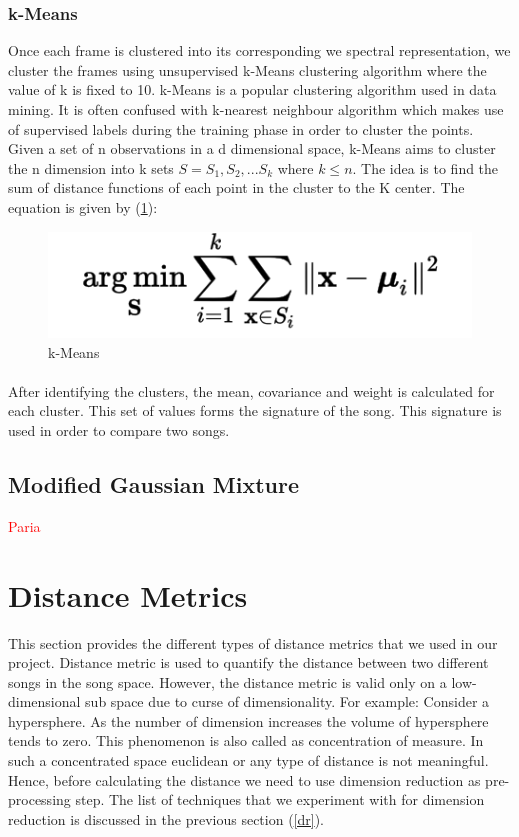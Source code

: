 \documentclass[12pt]{article}
\begin{document}
\subsubsection{k-Means}
Once each frame is clustered into its corresponding we spectral representation, we cluster the frames using unsupervised k-Means clustering algorithm where the value of k is  fixed to 10. k-Means is a popular clustering algorithm used in data mining. It is often confused with k-nearest neighbour algorithm which makes use of supervised labels during the training phase in order to cluster the points. Given a set of n observations in a d dimensional space, k-Means aims to cluster the n dimension into k sets $S = {S_1,S_2,...S_k}$ where $ k \leq n$. The idea is to find the sum of distance functions of each point in the cluster to the K center. The equation is given by (\ref{kmeans}):

\begin{figure}[h]\label{kmeans}
\center
\includegraphics{fig2.png}
\caption{k-Means}
\end{figure}

\paragraph{}
After identifying the clusters, the mean, covariance and weight is calculated for each cluster. This set of values forms the signature of the song. This signature is used in order to compare two songs.

\subsection{Modified Gaussian Mixture} \textcolor{red}{Paria}

\section{Distance Metrics}\label{sec:dist}
This section provides the different types of distance metrics that we used in our project. Distance metric is used to quantify the distance between two different songs in the song space. However, the distance metric is valid only on a low-dimensional sub space due to curse of dimensionality. For example: Consider a hypersphere. As the number of dimension increases the volume of hypersphere tends to zero. This phenomenon is also called as concentration of measure. In such a concentrated space euclidean or any type of distance is not meaningful. Hence, before calculating the distance we need to use dimension reduction as pre-processing step. The list of techniques that we experiment with for dimension reduction is discussed in the previous section (\ref{dr}).
\end{document}

